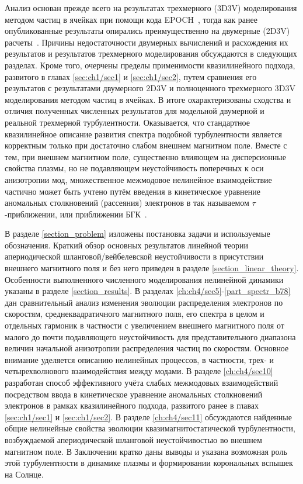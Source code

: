 Анализ основан прежде всего на результатах трехмерного (3D3V) моделирования методом частиц в ячейках при помощи кода EPOCH~\cite{Arber2015}, тогда как ранее опубликованные результаты опирались преимущественно на двумерные (2D3V) расчеты~\cite{Camporeale2008,Hellinger2014,Lazar2023,Lopez2020}. Причины недостаточности двумерных вычислений и расхождения их результатов и результатов трехмерного моделирования обсуждаются в следующих разделах. Кроме того, очерчены пределы применимости квазилинейного подхода, развитого в главах \ref{sec:ch1/sec1} и \ref{sec:ch1/sec2}, путем сравнения его результатов с результатами двумерного 2D3V и полноценного трехмерного 3D3V моделирования методом частиц в ячейках. В итоге охарактеризованы сходства и отличия полученных численных результатов для модельной двумерной и реальной трехмерной турбулентности. Оказывается, что стандартное квазилинейное описание развития спектра подобной турбулентности является корректным только при достаточно слабом внешнем магнитном поле. Вместе с тем, при внешнем магнитном поле, существенно влияющем на дисперсионные свойства плазмы, но не подавляющем неустойчивость поперечных к оси анизотропии мод, множественное межмодовое нелинейное взаимодействие частично может быть учтено путём введения в кинетическое уравнение аномальных столкновений (рассеяния) электронов в так называемом $\tau$-приближении, или приближении БГК~\cite{Krall1973,Alexandrov1984}. 

В разделе \ref{section_problem} изложены постановка задачи и используемые обозначения. Краткий обзор основных результатов линейной теории апериодической шланговой/вейбелевской неустойчивости в присутствии внешнего магнитного поля и без него приведен в разделе \ref{section_linear_theory}. Особенности выполненного численного моделирования нелинейной динамики указаны в разделе \ref{section_results}. В разделах \ref{ch:ch4/sec5}-\ref{part_spectr_b78} дан сравнительный анализ изменения эволюции распределения электронов по скоростям, среднеквадратичного магнитного поля, его спектра в целом и отдельных гармоник в частности с увеличением внешнего магнитного поля от малого до почти подавляющего неустойчивость для представительного диапазона величин начальной анизотропии распределения частиц по скоростям. 
Основное внимание уделяется описанию нелинейных процессов, в частности, трех- и четырехволнового взаимодействия между модами. В разделе \ref{ch:ch4/sec10} разработан способ эффективного учёта слабых межмодовых взаимодействий посредством ввода в кинетическое уравнение аномальных столкновений электронов в рамках квазилинейного подхода, развитого ранее в главах \ref{sec:ch1/sec1} и \ref{sec:ch1/sec2}. В разделе \ref{ch:ch4/sec11} обсуждаются найденные общие нелинейные свойства эволюции квазимагнитостатической турбулентности, возбуждаемой апериодической шланговой неустойчивостью во внешнем магнитном поле. В Заключении кратко даны выводы и указана возможная роль этой турбулентности в динамике плазмы и формировании корональных вспышек на Солнце. 


